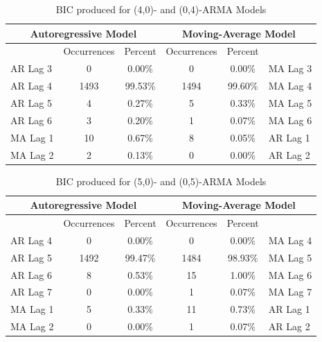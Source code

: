 \documentclass[oneside,12pt,openany]{book}
\begin{document}
      \begin{table}[hbt!]
          \centering
          \begin{tabular}{|l|c|c|c|c|l|}
              \hline
              \multicolumn{3}{|c|}{Autoregressive Model} & \multicolumn{3}{c|}{Moving-Average Model} \\ \hline
              \cellcolor{black} & Occurrences & Percent & Occurrences & Percent & \cellcolor{black} \\ \hline
              AR Lag 3 & 0 & 0.00\% & 0 & 0.00\% & MA Lag 3 \\ \hline
              AR Lag 4 & 1493 & 99.53\% & 1494 & 99.60\% & MA Lag 4 \\ \hline
              AR Lag 5 & 4 & 0.27\% & 5 & 0.33\% & MA Lag 5 \\ \hline
              AR Lag 6 & 3 & 0.20\% & 1 & 0.07\% & MA Lag 6 \\ \hline
              MA Lag 1 & 10 & 0.67\% & 8 & 0.05\% & AR Lag 1 \\ \hline
              MA Lag 2 & 2 & 0.13\% & 0 & 0.00\% & AR Lag 2 \\ \hline
          \end{tabular}
         \caption{BIC produced for (4,0)- and (0,4)-ARMA Models}
        \label{tab:bic4}
      \end{table}
  
    \begin{table}[hbt!]
        \centering
        \begin{tabular}{|l|c|c|c|c|l|}
            \hline
            \multicolumn{3}{|c|}{Autoregressive Model} & \multicolumn{3}{c|}{Moving-Average Model} \\ \hline
            \cellcolor{black} & Occurrences & Percent & Occurrences & Percent & \cellcolor{black} \\ \hline
            AR Lag 4 & 0 & 0.00\% & 0 & 0.00\% & MA Lag 4 \\ \hline
            AR Lag 5 & 1492 & 99.47\% & 1484 & 98.93\% & MA Lag 5 \\ \hline
            AR Lag 6 & 8 & 0.53\% & 15 & 1.00\% & MA Lag 6 \\ \hline
            AR Lag 7 & 0 & 0.00\% & 1 & 0.07\% & MA Lag 7 \\ \hline
            MA Lag 1 & 5 & 0.33\% & 11 & 0.73\% & AR Lag 1 \\ \hline
            MA Lag 2 & 0 & 0.00\% & 1 & 0.07\% & AR Lag 2 \\ \hline
        \end{tabular}
        \caption{BIC produced for (5,0)- and (0,5)-ARMA Models}
        \label{tab:bic5}
    \end{table}
    
\end{document}

